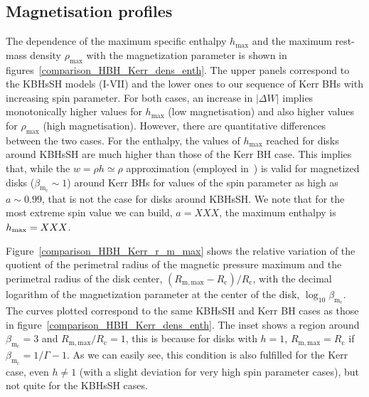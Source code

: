 \documentclass[twocolumn,aps,showpacs,showkeys,prd,superscriptaddress,byrevtex, amsmath]{revtex4-1}
\begin{document}
\subsection{Magnetisation profiles}

The dependence of the maximum specific enthalpy $h_{\mathrm{max}}$ and the maximum rest-mass density $\rho_{\mathrm{max}}$ with the magnetization parameter is shown in figures~\ref{comparison_HBH_Kerr_dens_enth}. The upper panels correspond to the KBHsSH models (I-VII) and the lower ones to our sequence of Kerr BHs with increasing spin parameter. For both cases, an increase in $|\Delta W|$ implies monotonically  higher values for $h_{\mathrm{max}}$ (low magnetisation) and also higher values for $\rho_{\mathrm{max}}$ (high magnetisation). However, there are quantitative differences between the two cases. For the enthalpy, the values of $h_{\mathrm{max}}$ reached for disks around KBHsSH are much higher than those of the Kerr BH case. This implies that, while the $w = \rho h \simeq \rho$ approximation (employed in~\cite{Komissarov:2006,Gimeno-Soler:2017}) is valid for magnetized disks ($\beta_{\mathrm{m_c}} \sim 1$) around Kerr BHs for values of the spin parameter as high as $a \sim 0.99$, that is not the case for disks around KBHsSH. We note that for the most extreme spin value we can build, $a=XXX$, the maximum enthalpy is $h_{\rm max}=XXX$. 

Figure~\ref{comparison_HBH_Kerr_r_m_max} shows the relative variation of the quotient of the perimetral radius of the magnetic pressure maximum and the perimetral radius of the disk center, $(R_{\mathrm{m, max}}-R_{\mathrm{c}})/R_{\mathrm{c}}$, with the decimal logarithm of the magnetization parameter at the center of the disk, $\log_{10} \beta_{\mathrm{m_c}}$. The curves plotted correspond to the same KBHsSH and Kerr BH cases as those in figure~\ref{comparison_HBH_Kerr_dens_enth}. The inset shows a region around $\beta_{\mathrm{m_c}} = 3$ and $R_{\mathrm{m, max}}/R_{\mathrm{c}} = 1$, this is because for disks with $h = 1$, $R_{\mathrm{m, max}} = R_{\mathrm{c}}$ if $\beta_{\mathrm{m_c}} = 1 / \Gamma - 1$. As we can easily see, this condition is also fulfilled for the Kerr case, even $h \neq 1$ (with a slight deviation for very high spin parameter cases), but not quite for the KBHsSH cases. 
\end{document}

